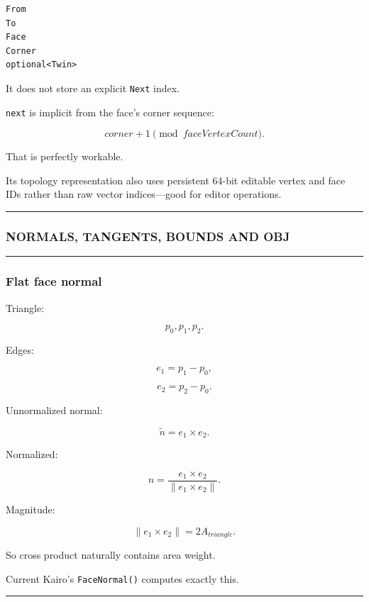 \begin{verbatim}
From
To
Face
Corner
optional<Twin>
\end{verbatim}

It does not store an explicit \texttt{Next} index.

\texttt{next} is implicit from the face's corner sequence:

\[
corner+1\pmod{faceVertexCount}.
\]

That is perfectly workable.

Its topology representation also uses persistent 64-bit editable vertex and face IDs rather than raw vector indices---good for editor operations.

\begin{center}\rule{0.5\linewidth}{0.5pt}\end{center}

\subsubsection{NORMALS, TANGENTS, BOUNDS AND OBJ}\label{normals-tangents-bounds-and-obj}

\begin{center}\rule{0.5\linewidth}{0.5pt}\end{center}

\subsubsection{Flat face normal}\label{flat-face-normal}

Triangle:

\[
p_0,p_1,p_2.
\]

Edges:

\[
e_1=p_1-p_0,
\]

\[
e_2=p_2-p_0.
\]

Unnormalized normal:

\[
\tilde n=
e_1\times e_2.
\]

Normalized:

\[
\boxed{
n=
\frac{
e_1\times e_2
}{
\|e_1\times e_2\|
}.
}
\]

Magnitude:

\[
\|e_1\times e_2\|
=
2A_{triangle}.
\]

So cross product naturally contains area weight.

Current Kairo's \texttt{FaceNormal()} computes exactly this.

\begin{center}\rule{0.5\linewidth}{0.5pt}\end{center}

